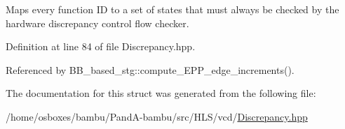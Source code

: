 Maps every function ID to a set of states that must always be checked by the hardware discrepancy control flow checker. 



Definition at line 84 of file Discrepancy.\+hpp.



Referenced by B\+B\+\_\+based\+\_\+stg\+::compute\+\_\+\+E\+P\+P\+\_\+edge\+\_\+increments().



The documentation for this struct was generated from the following file\+:\begin{DoxyCompactItemize}
\item 
/home/osboxes/bambu/\+Pand\+A-\/bambu/src/\+H\+L\+S/vcd/\hyperlink{Discrepancy_8hpp}{Discrepancy.\+hpp}\end{DoxyCompactItemize}
